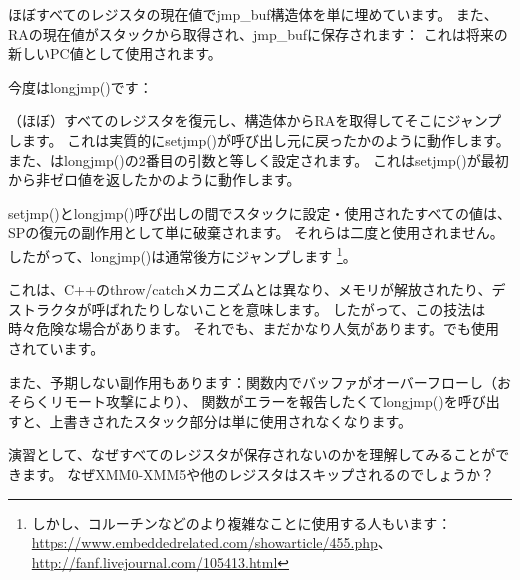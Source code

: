 ほぼすべてのレジスタの現在値でjmp\_buf構造体を単に埋めています。
また、\ac{RA}の現在値がスタックから取得され、jmp\_bufに保存されます：
これは将来の新しい\ac{PC}値として使用されます。

今度はlongjmp()です：



（ほぼ）すべてのレジスタを復元し、構造体から\ac{RA}を取得してそこにジャンプします。
これは実質的にsetjmp()が呼び出し元に戻ったかのように動作します。
また、はlongjmp()の2番目の引数と等しく設定されます。
これはsetjmp()が最初から非ゼロ値を返したかのように動作します。

setjmp()とlongjmp()呼び出しの間でスタックに設定・使用されたすべての値は、\ac{SP}の復元の副作用として単に破棄されます。
それらは二度と使用されません。
したがって、longjmp()は通常後方にジャンプします
\footnote{しかし、コルーチンなどのより複雑なことに使用する人もいます：\url{https://www.embeddedrelated.com/showarticle/455.php}、
\url{http://fanf.livejournal.com/105413.html}}。

これは、C++のthrow/catchメカニズムとは異なり、メモリが解放されたり、デストラクタが呼ばれたりしないことを意味します。
したがって、この技法は時々危険な場合があります。
それでも、まだかなり人気があります。\oracle{}でも使用されています。

また、予期しない副作用もあります：関数内でバッファがオーバーフローし（おそらくリモート攻撃により）、
関数がエラーを報告したくてlongjmp()を呼び出すと、上書きされたスタック部分は単に使用されなくなります。

演習として、なぜすべてのレジスタが保存されないのかを理解してみることができます。
なぜXMM0-XMM5や他のレジスタはスキップされるのでしょうか？